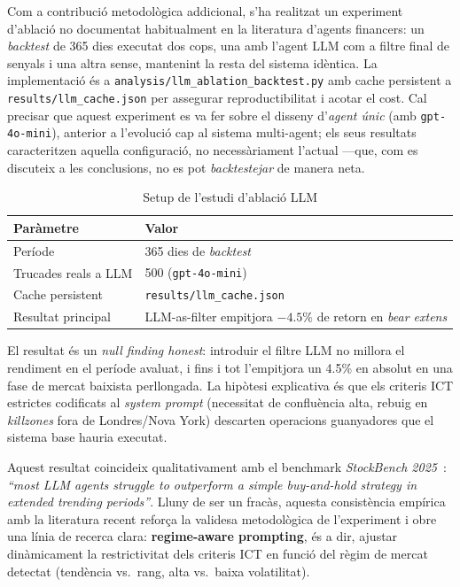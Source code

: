 \documentclass[12pt, a4paper]{report}
\begin{document}
Com a contribució metodològica addicional, s'ha realitzat un experiment d'ablació no documentat habitualment en la literatura d'agents financers: un \textit{backtest} de 365 dies executat dos cops, una amb l'agent LLM com a filtre final de senyals i una altra sense, mantenint la resta del sistema idèntica. La implementació és a \texttt{analysis/llm\_ablation\_backtest.py} amb cache persistent a \texttt{results/llm\_cache.json} per assegurar reproductibilitat i acotar el cost. Cal precisar que aquest experiment es va fer sobre el disseny d'\emph{agent únic} (amb \texttt{gpt-4o-mini}), anterior a l'evolució cap al sistema multi-agent; els seus resultats caracteritzen aquella configuració, no necessàriament l'actual ---que, com es discuteix a les conclusions, no es pot \textit{backtestejar} de manera neta.

\begin{table}[H]
\centering
\caption{Setup de l'estudi d'ablació LLM}
\label{tab:ablation-setup}
\begin{tabular}{@{}L{5cm}L{8cm}@{}}
\toprule
\textbf{Paràmetre} & \textbf{Valor} \\
\midrule
Període                     & 365 dies de \textit{backtest} \\
Trucades reals a LLM        & 500 (\texttt{gpt-4o-mini}) \\
Cache persistent            & \texttt{results/llm\_cache.json} \\
Resultat principal          & LLM-as-filter empitjora $-4.5\%$ de retorn en \textit{bear extens} \\
\bottomrule
\end{tabular}
\end{table}

El resultat és un \emph{null finding honest}: introduir el filtre LLM no millora el rendiment en el període avaluat, i fins i tot l'empitjora un 4.5\% en absolut en una fase de mercat baixista perllongada. La hipòtesi explicativa és que els criteris ICT estrictes codificats al \textit{system prompt} (necessitat de confluència alta, rebuig en \textit{killzones} fora de Londres/Nova York) descarten operacions guanyadores que el sistema base hauria executat.

\begin{infobox}
Aquest resultat coincideix qualitativament amb el benchmark \emph{StockBench 2025}~\cite{stockbench2025}: \textit{``most LLM agents struggle to outperform a simple buy-and-hold strategy in extended trending periods''}. Lluny de ser un fracàs, aquesta consistència empírica amb la literatura recent reforça la validesa metodològica de l'experiment i obre una línia de recerca clara: \textbf{regime-aware prompting}, és a dir, ajustar dinàmicament la restrictivitat dels criteris ICT en funció del règim de mercat detectat (tendència vs.\ rang, alta vs.\ baixa volatilitat).
\end{infobox}
\end{document}
